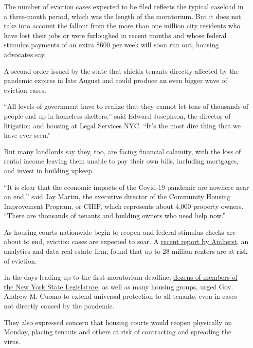 The number of eviction cases expected to be filed reflects the typical
caseload in a three-month period, which was the length of the
moratorium. But it does not take into account the fallout from the more
than one million city residents who have lost their jobs or were
furloughed in recent months and whose federal stimulus payments of an
extra \$600 per week will soon run out, housing advocates say.

A second order issued by the state that shields tenants directly
affected by the pandemic expires in late August and could produce an
even bigger wave of eviction cases.

``All levels of government have to realize that they cannot let tens of
thousands of people end up in homeless shelters,'' said Edward
Josephson, the director of litigation and housing at Legal Services NYC.
``It's the most dire thing that we have ever seen.''

But many landlords say they, too, are facing financial calamity, with
the loss of rental income leaving them unable to pay their own bills,
including mortgages, and invest in building upkeep.

``It is clear that the economic impacts of the Covid-19 pandemic are
nowhere near an end,'' said Jay Martin, the executive director of the
Community Housing Improvement Program, or CHIP, which represents about
4,000 property owners. ``There are thousands of tenants and building
owners who need help now.''

As housing courts nationwide begin to reopen and federal stimulus checks
are about to end, eviction cases are expected to soar. A
\href{https://www.amherstcapital.com/documents/20649/0/Amherst+Market+Commentary+-+May+2020+Issue/b6520038-308f-4708-8ed5-3b678d8ed560}{recent
report by Amherst}, an analytics and data real estate firm, found that
up to 28 million renters are at risk of eviction.

In the days leading up to the first moratorium deadline,
\href{https://www.nysenate.gov/sites/default/files/article/attachment/2020.06.17_-_letter_from_nys_legislators_to_gov._cuomo_re_eviction_moratorium_and_court_closures.pdf}{dozens
of members of the New York State Legislature}, as well as many housing
groups, urged Gov. Andrew M. Cuomo to extend universal protection to all
tenants, even in cases not directly caused by the pandemic.

They also expressed concern that housing courts would reopen physically
on Monday, placing tenants and others at risk of contracting and
spreading the virus.

